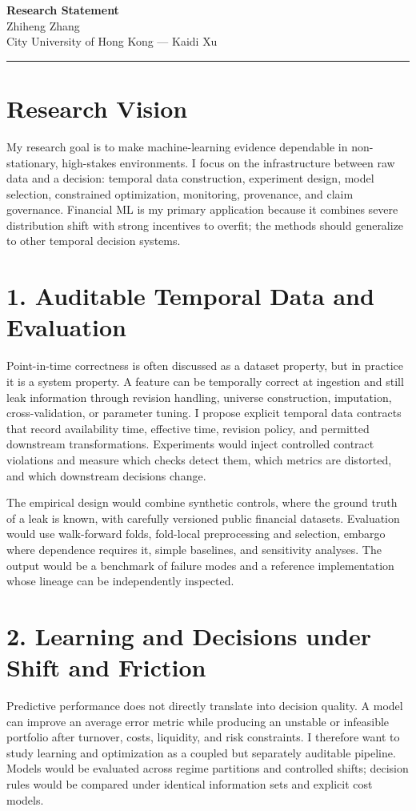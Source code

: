 \documentclass[11pt]{article}
\newcommand{\ApplicantName}{Zhiheng Zhang}
\begin{document}
\begin{center}
{\LARGE\bfseries Research Statement}\\[0.25em]
{\large \ApplicantName}\\
City University of Hong Kong --- Kaidi Xu
\end{center}
\vspace{0.35em}\hrule\vspace{0.65em}

\section*{Research Vision}
My research goal is to make machine-learning evidence dependable in non-stationary, high-stakes environments. I focus on the infrastructure between raw data and a decision: temporal data construction, experiment design, model selection, constrained optimization, monitoring, provenance, and claim governance. Financial ML is my primary application because it combines severe distribution shift with strong incentives to overfit; the methods should generalize to other temporal decision systems.

\section*{1. Auditable Temporal Data and Evaluation}
Point-in-time correctness is often discussed as a dataset property, but in practice it is a system property. A feature can be temporally correct at ingestion and still leak information through revision handling, universe construction, imputation, cross-validation, or parameter tuning. I propose explicit temporal data contracts that record availability time, effective time, revision policy, and permitted downstream transformations. Experiments would inject controlled contract violations and measure which checks detect them, which metrics are distorted, and which downstream decisions change.

The empirical design would combine synthetic controls, where the ground truth of a leak is known, with carefully versioned public financial datasets. Evaluation would use walk-forward folds, fold-local preprocessing and selection, embargo where dependence requires it, simple baselines, and sensitivity analyses. The output would be a benchmark of failure modes and a reference implementation whose lineage can be independently inspected.

\section*{2. Learning and Decisions under Shift and Friction}
Predictive performance does not directly translate into decision quality. A model can improve an average error metric while producing an unstable or infeasible portfolio after turnover, costs, liquidity, and risk constraints. I therefore want to study learning and optimization as a coupled but separately auditable pipeline. Models would be evaluated across regime partitions and controlled shifts; decision rules would be compared under identical information sets and explicit cost models.
\end{document}
